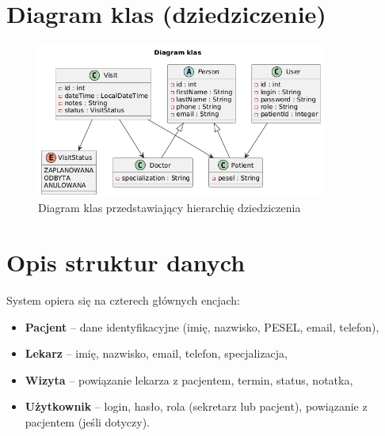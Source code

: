 \section{Diagram klas (dziedziczenie)}
\begin{figure}[H]
\centering
\includegraphics[width=0.85\textwidth]{figures/DiagramKlas.png}
\caption{Diagram klas przedstawiający hierarchię dziedziczenia}
\end{figure}

\section{Opis struktur danych}
System opiera się na czterech głównych encjach:
\begin{itemize}
  \item \textbf{Pacjent} -- dane identyfikacyjne (imię, nazwisko, PESEL, email, telefon),
  \item \textbf{Lekarz} -- imię, nazwisko, email, telefon, specjalizacja,
  \item \textbf{Wizyta} -- powiązanie lekarza z pacjentem, termin, status, notatka,
  \item \textbf{Użytkownik} -- login, hasło, rola (sekretarz lub pacjent), powiązanie z pacjentem (jeśli dotyczy).
\end{itemize}
